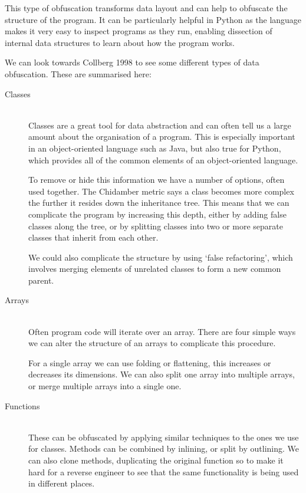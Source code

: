 \documentclass[twoside,a4paper]{report}
\begin{document}
This type of obfuscation transforms data layout and can help to obfuscate the structure of the program. It can be
particularly helpful in Python as the language makes it very easy to inspect programs as they run, enabling dissection of internal data
structures to learn about how the program works.

We can look towards Collberg 1998 \cite{dataobf} to see some different types of data obfuscation. These are summarised here:

\begin{description}
\item[Classes] \hfill \\
Classes are a great tool for data abstraction and can often tell us a large amount about the organisation of a program. This is
especially important in an object-oriented language such as Java, but also true for Python, which provides all of the common elements of
an object-oriented language.

To remove or hide this information we have a number of options, often used together. The Chidamber metric says a class becomes more complex
the further it resides down the inheritance tree. This means that we can complicate the program by increasing this depth, either by adding
false classes along the tree, or by splitting classes into two or more separate classes that inherit from each other.

We could also complicate the structure by using `false refactoring', which involves merging elements of unrelated classes to form a new common parent.

\item[Arrays] \hfill \\
Often program code will iterate over an array. There are four simple ways we can alter the structure of an arrays to complicate
this procedure.

For a single array we can use folding or flattening, this increases or decreases its dimensions. We can also split one array into multiple
arrays, or merge multiple arrays into a single one.

\item[Functions] \hfill \\
These can be obfuscated by applying similar techniques to the ones we use for classes. Methods can be combined by inlining, or split by outlining.
We can also clone methods, duplicating the original function so to make it hard for a reverse engineer to see that the same
functionality is being used in different places.


\end{description}
\end{document}
